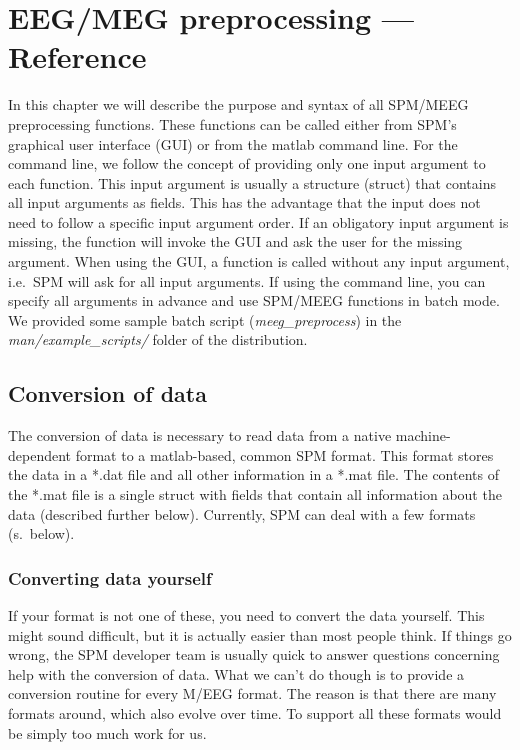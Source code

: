 \chapter{EEG/MEG preprocessing --- Reference \label{Chap:eeg:preprocessing}}

In this chapter we will describe the purpose and syntax of all
SPM/MEEG preprocessing functions. These functions can be called either from
SPM's graphical user interface (GUI) or from the matlab command
line. For the command line, we follow the concept of providing only one input
argument to each function. This input argument is usually a structure (struct)
that contains all input arguments as fields. This has the advantage
that the input does not need to follow a specific input argument
order. If an obligatory input argument is missing, the function will
invoke the GUI and ask the user for the missing argument. When using
the GUI, a function is called without any input argument, i.e.~SPM
will ask for all input arguments. If using the command line, you
can specify all arguments in advance and use SPM/MEEG functions in
batch mode. We provided some sample batch script
(\textit{meeg\_preprocess}) in the \textit{man/example\_scripts/}
folder of the distribution.

\section{Conversion of data}
The conversion of data is necessary to read data from a native
machine-dependent format to a matlab-based, common SPM format. This
format stores the data in a *.dat file and all other information in a
*.mat file. The contents of the *.mat file is a single struct with
fields that contain all information about the data (described
further below). Currently, SPM can deal with a few formats (s.~below). 

\subsection{Converting data yourself}
If your format is not one of these, you need to convert the data
yourself. This might sound difficult, but it is actually easier than
most people think. If things go wrong, the SPM developer team is
usually quick to answer questions concerning help with the conversion
of data. What we can't do though is to provide a conversion routine
for every M/EEG format. The reason is that there are many formats
around, which also evolve over time. To support all these formats
would be simply too much work for us. 

